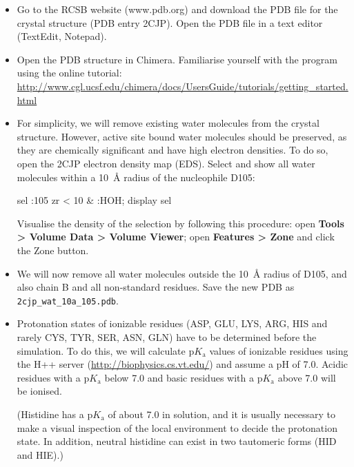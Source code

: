 \documentclass[10pt]{article}
\begin{document}
\begin{itemize}
    \item Go to the RCSB website (www.pdb.org) and download the PDB file for the crystal structure (PDB entry 2CJP).\autocite{Mowbray2006} Open the PDB file in a text editor (TextEdit, Notepad). 
    \item Open the PDB structure in Chimera. Familiarise yourself with the program using the online tutorial: \url{http://www.cgl.ucsf.edu/chimera/docs/UsersGuide/tutorials/getting_started.html}
    \item For simplicity, we will remove existing water molecules from the crystal structure. However, active site bound water molecules should be preserved, as they are chemically significant and have high electron densities. To do so, open the 2CJP electron density map (EDS). Select and show all water molecules within a 10~\r{A} radius of the nucleophile D105:
        \begin{cmdline}
            sel :105 zr < 10 & :HOH; display sel
        \end{cmdline}
        Visualise the density of the selection by following this procedure: open \textbf{Tools > Volume Data > Volume Viewer}; open \textbf{Features > Zone} and click the Zone button. 
    \item We will now remove all water molecules outside the 10~\r{A} radius of D105, and also chain B and all non-standard residues. Save the new PDB as \texttt{2cjp\_wat\_10a\_105.pdb}.
    \item Protonation states of ionizable residues (ASP, GLU, LYS, ARG, HIS and rarely CYS, TYR, SER, ASN, GLN) have to be determined before the simulation. To do this, we will calculate \(\mathrm pK_\mathrm{a}\) values of ionizable residues using the H++ server (\url{http://biophysics.cs.vt.edu/}) and assume a pH of 7.0. Acidic residues with a \(\mathrm pK_\mathrm{a}\) below 7.0 and basic residues with a \(\mathrm pK_\mathrm{a}\) above 7.0 will be ionised.

          (Histidine has a \(\mathrm pK_\mathrm{a}\) of about 7.0 in solution, and it is usually necessary to make a visual inspection of the local environment to decide the protonation state. In addition, neutral histidine can exist in two tautomeric forms (HID and HIE).)
\end{itemize}
\end{document}
